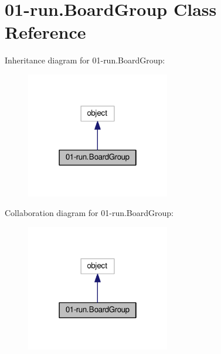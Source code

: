 \hypertarget{class01-run_1_1BoardGroup}{}\section{01-\/run.Board\+Group Class Reference}
\label{class01-run_1_1BoardGroup}


Inheritance diagram for 01-\/run.Board\+Group\+:
\nopagebreak
\begin{figure}[H]
\begin{center}
\leavevmode
\includegraphics[width=178pt]{class01-run_1_1BoardGroup__inherit__graph}
\end{center}
\end{figure}


Collaboration diagram for 01-\/run.Board\+Group\+:
\nopagebreak
\begin{figure}[H]
\begin{center}
\leavevmode
\includegraphics[width=178pt]{class01-run_1_1BoardGroup__coll__graph}
\end{center}
\end{figure}
